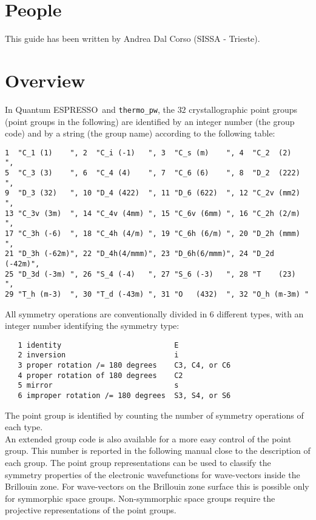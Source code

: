 \documentclass[12pt,a4paper]{article}
\def\qe{{\sc Quantum ESPRESSO}}
\def\thermo{\texttt{thermo\_pw}}
\begin{document}
\newpage
\section{\color{coral}People}
This guide has been written by Andrea Dal Corso (SISSA - Trieste).

\newpage
\section{\color{coral}Overview}
In \qe\ and \thermo, the $32$ crystallographic point groups 
(point groups in the following) are identified by an integer number 
(the group code) and 
by a string (the group name) according to the following table:

\begin{verbatim}
1  "C_1 (1)    ", 2  "C_i (-1)   ", 3  "C_s (m)    ", 4  "C_2  (2)   ", 
5  "C_3 (3)    ", 6  "C_4 (4)    ", 7  "C_6 (6)    ", 8  "D_2  (222) ", 
9  "D_3 (32)   ", 10 "D_4 (422)  ", 11 "D_6 (622)  ", 12 "C_2v (mm2) ", 
13 "C_3v (3m)  ", 14 "C_4v (4mm) ", 15 "C_6v (6mm) ", 16 "C_2h (2/m) ", 
17 "C_3h (-6)  ", 18 "C_4h (4/m) ", 19 "C_6h (6/m) ", 20 "D_2h (mmm) ", 
21 "D_3h (-62m)", 22 "D_4h(4/mmm)", 23 "D_6h(6/mmm)", 24 "D_2d (-42m)", 
25 "D_3d (-3m) ", 26 "S_4 (-4)   ", 27 "S_6 (-3)   ", 28 "T    (23)  ", 
29 "T_h (m-3)  ", 30 "T_d (-43m) ", 31 "O   (432)  ", 32 "O_h (m-3m) "  
\end{verbatim}
All symmetry operations are conventionally divided in $6$ 
different types, with an integer number identifying the symmetry type:
\begin{verbatim}
   1 identity                          E
   2 inversion                         i
   3 proper rotation /= 180 degrees    C3, C4, or C6
   4 proper rotation of 180 degrees    C2
   5 mirror                            s
   6 improper rotation /= 180 degrees  S3, S4, or S6
\end{verbatim}
The point group is identified by counting the number of symmetry operations of 
each type. \\
An extended group code is also available for a more easy control of the
point group. This number is reported in the following manual close
to the description of each group.
The point group representations can be used to classify the symmetry properties 
of the electronic wavefunctions for wave-vectors inside the Brillouin zone. 
For wave-vectors on the Brillouin zone surface this is possible only for 
symmorphic space groups. Non-symmorphic space groups require the projective 
representations of the point groups. 
\end{document}
